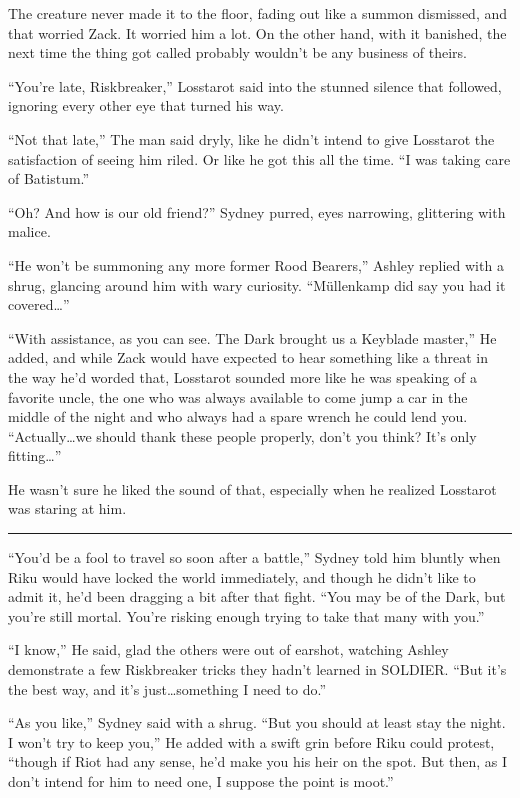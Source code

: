 The creature never made it to the floor, fading out like a summon dismissed, and that worried Zack. It worried him a lot. On the other hand, with it banished, the next time the thing got called probably wouldn't be any business of theirs.

``You're late, Riskbreaker,'' Losstarot said into the stunned silence that followed, ignoring every other eye that turned his way.

``Not that late,'' The man said dryly, like he didn't intend to give Losstarot the satisfaction of seeing him riled. Or like he got this all the time. ``I was taking care of Batistum.''

``Oh? And how is our old friend?'' Sydney purred, eyes narrowing, glittering with malice.

``He won't be summoning any more former Rood Bearers,'' Ashley replied with a shrug, glancing around him with wary curiosity. ``Müllenkamp did say you had it covered\ldots''

``With assistance, as you can see. The Dark brought us a Keyblade master,'' He added, and while Zack would have expected to hear something like a threat in the way he'd worded that, Losstarot sounded more like he was speaking of a favorite uncle, the one who was always available to come jump a car in the middle of the night and who always had a spare wrench he could lend you. ``Actually\ldots we should thank these people properly, don't you think? It's only fitting\ldots''

He wasn't sure he liked the sound of that, especially when he realized Losstarot was staring at him.

\fancybreak{\pfbreakdisplay}


``You'd be a fool to travel so soon after a battle,'' Sydney told him bluntly when Riku would have locked the world immediately, and though he didn't like to admit it, he'd been dragging a bit after that fight. ``You may be of the Dark, but you're still mortal. You're risking enough trying to take that many with you.''

``I know,'' He said, glad the others were out of earshot, watching Ashley demonstrate a few Riskbreaker tricks they hadn't learned in SOLDIER. ``But it's the best way, and it's just\ldots something I need to do.''

``As you like,'' Sydney said with a shrug. ``But you should at least stay the night. I won't try to keep you,'' He added with a swift grin before Riku could protest, ``though if Riot had any sense, he'd make you his heir on the spot. But then, as I don't intend for him to need one, I suppose the point is moot.''

